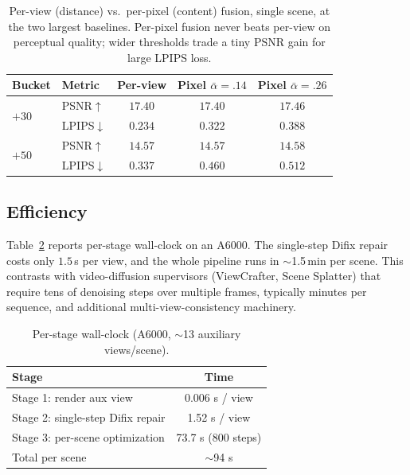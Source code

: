 \documentclass[10pt,twocolumn,letterpaper]{article}
\begin{document}
\begin{table}[t]
\centering
\small
\caption{Per-view (distance) vs.\ per-pixel (content) fusion, single scene, at
the two largest baselines. Per-pixel fusion never beats per-view on perceptual
quality; wider thresholds trade a tiny PSNR gain for large LPIPS loss.}
\label{tab:content}
\begin{tabular}{llccc}
\toprule
Bucket & Metric & Per-view & Pixel $\bar\alpha{=}.14$ & Pixel $\bar\alpha{=}.26$ \\
\midrule
\multirow{2}{*}{$+30$} & PSNR$\uparrow$  & $17.40$ & $17.40$ & $17.46$ \\
                       & LPIPS$\downarrow$& $\mathbf{0.234}$ & $0.322$ & $0.388$ \\
\multirow{2}{*}{$+50$} & PSNR$\uparrow$  & $14.57$ & $14.57$ & $14.58$ \\
                       & LPIPS$\downarrow$& $\mathbf{0.337}$ & $0.460$ & $0.512$ \\
\bottomrule
\end{tabular}
\end{table}

\subsection{Efficiency}
Table~\ref{tab:timing} reports per-stage wall-clock on an A6000. The single-step
Difix repair costs only $1.5$\,s per view, and the whole pipeline runs in
$\sim$1.5\,min per scene. This contrasts with video-diffusion supervisors
(ViewCrafter, Scene Splatter) that require tens of denoising steps over multiple
frames, typically minutes per sequence, and additional multi-view-consistency
machinery.

\begin{table}[t]
\centering
\small
\caption{Per-stage wall-clock (A6000, $\sim$13 auxiliary views/scene).}
\label{tab:timing}
\begin{tabular}{lc}
\toprule
Stage & Time \\
\midrule
Stage 1: render aux view          & 0.006 s / view \\
Stage 2: single-step Difix repair & 1.52 s / view \\
Stage 3: per-scene optimization   & 73.7 s (800 steps) \\
\midrule
Total per scene                   & $\sim$94 s \\
\bottomrule
\end{tabular}
\end{table}
\end{document}
